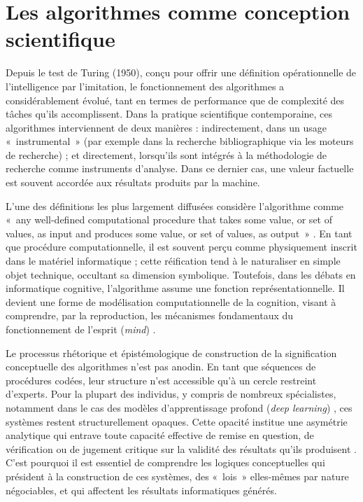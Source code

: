 \documentclass[fra, final]{anthology-ch}
\begin{document}
\section{Les algorithmes comme conception scientifique}

Depuis le test de Turing (1950), conçu pour offrir une définition opérationnelle de l'intelligence par l'imitation, le fonctionnement des algorithmes a considérablement évolué, tant en termes de performance que de complexité des tâches qu'ils accomplissent. Dans la pratique scientifique contemporaine, ces algorithmes interviennent de deux manières : indirectement, dans un usage «~instrumental~» (par exemple dans la recherche bibliographique via les moteurs de recherche) ; et directement, lorsqu'ils sont intégrés à la méthodologie de recherche comme instruments d’analyse. Dans ce dernier cas, une valeur factuelle est souvent accordée aux résultats produits par la machine.

L'une des définitions les plus largement diffusées considère l'algorithme comme «~any well-defined computational procedure that takes some value, or set of values, as input and produces some value, or set of values, as output~» \cite{cormen2022}. En tant que procédure computationnelle, il est souvent perçu comme physiquement inscrit dans le matériel informatique ; cette réification tend à le naturaliser en simple objet technique, occultant sa dimension symbolique. Toutefois, dans les débats en informatique cognitive, l’algorithme assume une fonction représentationnelle. Il devient une forme de modélisation computationnelle de la cognition, visant à comprendre, par la reproduction, les mécanismes fondamentaux du fonctionnement de l’esprit (\textit{mind}) \cite{milic1966, fodor1988}.

Le processus rhétorique et épistémologique de construction de la signification conceptuelle des algorithmes n’est pas anodin. En tant que séquences de procédures codées, leur structure n'est accessible qu’à un cercle restreint d'experts. Pour la plupart des individus, y compris de nombreux spécialistes, notamment dans le cas des modèles d’apprentissage profond (\textit{deep learning}) \cite{ducoffe2015, bender2021, holtzman2023}, ces systèmes restent structurellement opaques. Cette opacité institue une asymétrie analytique qui entrave toute capacité effective de remise en question, de vérification ou de jugement critique sur la validité des résultats qu’ils produisent \cite{bonenfant2020, bender2024}. C’est pourquoi il est essentiel de comprendre les logiques conceptuelles qui président à la construction de ces systèmes, des «~lois~» elles-mêmes par nature négociables, et qui affectent les résultats informatiques générés.
\end{document}

